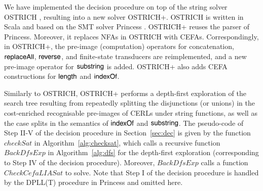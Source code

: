 
We have implemented the decision procedure on top of the string solver OSTRICH \cite{CHL+19}, resulting into a new solver OSTRICH+. OSTRICH is  written in Scala and based on the SMT solver Princess \cite{princess08}. 
OSTRICH+ reuses the parser of Princess. Moreover, it replaces NFAs in OSTRICH with CEFAs. Correspondingly, in OSTRICH+, the pre-image  (computation) operators for concatenation, $\mathsf{replaceAll}$, $\mathsf{reverse}$, and finite-state transducers are reimplemented, and a new pre-image operator for $\mathsf{substring}$ is added. OSTRICH+ also adds CEFA constructions for $\mathsf{length}$ and $\mathsf{indexOf}$.  

Similarly to OSTRICH, OSTRICH+ performs a depth-first exploration of the search tree resulting from repeatedly
splitting the disjunctions (or unions) in the cost-enriched recognisable pre-images of CERLs under string functions, as well as the case splits in the semantics of $\mathsf{indexOf}$ and $\mathsf{substring}$.
The pseudo-code of Step II-V of the decision procedure in Section~\ref{sec:dec} is given by  the function $\mathit{checkSat}$ in Algorithm~\ref{alg:checksat}, which calls a recursive function  $\mathit{BackDfsExp}$ in Algorithm~\ref{alg:dfs} for the depth-first exploration (corresponding to Step IV of the decision procedure). Moreover, $\mathit{BackDfsExp}$ calls a function $\mathit{CheckCefaLIASat}$ to solve. Note that Step I of the decision procedure is handled by the DPLL(T) procedure in Princess and omitted here.


